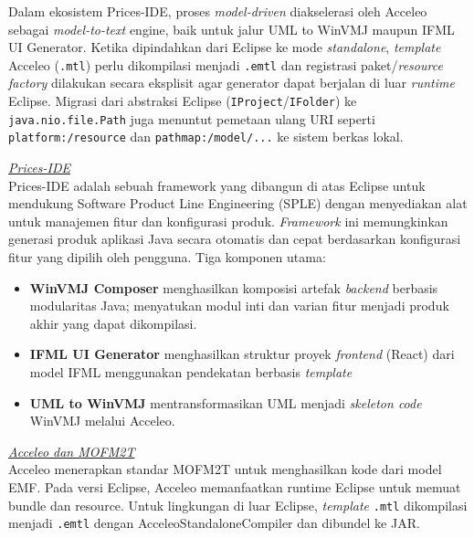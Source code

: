 \documentclass[12pt,a4paper,onecolumn]{article}
\newcommand{\f}[1]{\textit{#1}}
\begin{document}
Dalam ekosistem Prices-IDE, proses \f{model-driven} diakselerasi oleh Acceleo sebagai \f{model-to-text} engine, baik untuk jalur UML to WinVMJ maupun IFML UI Generator. Ketika dipindahkan dari Eclipse ke mode \f{standalone}, \textit{template} Acceleo (\texttt{.mtl}) perlu dikompilasi menjadi \texttt{.emtl} dan registrasi paket/\f{resource factory} dilakukan secara eksplisit agar generator dapat berjalan di luar \f{runtime} Eclipse. Migrasi dari abstraksi Eclipse (\texttt{IProject}/\texttt{IFolder}) ke \texttt{java.nio.file.Path} juga menuntut pemetaan ulang URI seperti \texttt{platform:/resource} dan \texttt{pathmap:/model/...} ke sistem berkas lokal.

\vspace*{0.5\baselineskip}

\underline{\textit{Prices-IDE}} \vspace{5pt} \\
Prices-IDE adalah sebuah framework yang dibangun di atas Eclipse untuk mendukung Software Product Line Engineering (SPLE) dengan menyediakan alat untuk manajemen fitur dan konfigurasi produk. \textit{Framework} ini memungkinkan generasi produk aplikasi Java secara otomatis dan cepat berdasarkan konfigurasi fitur yang dipilih oleh pengguna. Tiga komponen utama:
\begin{itemize}[leftmargin=*]
  \item \textbf{WinVMJ Composer} menghasilkan komposisi artefak \textit{backend} berbasis modularitas Java; menyatukan modul inti dan varian fitur menjadi produk akhir yang dapat dikompilasi.
  \item \textbf{IFML UI Generator} menghasilkan struktur proyek \textit{frontend} (React) dari model IFML menggunakan pendekatan berbasis \f{template}
  \item \textbf{UML to WinVMJ} mentransformasikan UML menjadi \f{skeleton code} WinVMJ melalui Acceleo.
\end{itemize}

\vspace*{0.5\baselineskip}

\underline{\textit{Acceleo dan MOFM2T}} \vspace{5pt} \\
Acceleo menerapkan standar MOFM2T untuk menghasilkan kode dari model EMF. Pada versi Eclipse, Acceleo memanfaatkan runtime Eclipse untuk memuat bundle dan resource. Untuk lingkungan di luar Eclipse, \textit{template} \texttt{.mtl} dikompilasi menjadi \texttt{.emtl} dengan AcceleoStandaloneCompiler dan dibundel ke JAR.
\end{document}
